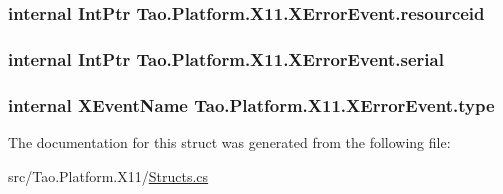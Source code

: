 \label{struct_tao_1_1_platform_1_1_x11_1_1_x_error_event_ac14a145f2eab548be2fceafa5f6c25ff}
\hypertarget{struct_tao_1_1_platform_1_1_x11_1_1_x_error_event_ac7b0c4ba5b882d353d5ad0f9f2017207}{
\subsubsection[{resourceid}]{\setlength{\rightskip}{0pt plus 5cm}internal IntPtr {\bf Tao.Platform.X11.XErrorEvent.resourceid}}}
\label{struct_tao_1_1_platform_1_1_x11_1_1_x_error_event_ac7b0c4ba5b882d353d5ad0f9f2017207}
\hypertarget{struct_tao_1_1_platform_1_1_x11_1_1_x_error_event_a2e56f1ab5dca13dda7c236bd4ea0bde5}{
\subsubsection[{serial}]{\setlength{\rightskip}{0pt plus 5cm}internal IntPtr {\bf Tao.Platform.X11.XErrorEvent.serial}}}
\label{struct_tao_1_1_platform_1_1_x11_1_1_x_error_event_a2e56f1ab5dca13dda7c236bd4ea0bde5}
\hypertarget{struct_tao_1_1_platform_1_1_x11_1_1_x_error_event_a5a939be28f2545b3b519ab16ecab0cda}{
\subsubsection[{type}]{\setlength{\rightskip}{0pt plus 5cm}internal {\bf XEventName} {\bf Tao.Platform.X11.XErrorEvent.type}}}
\label{struct_tao_1_1_platform_1_1_x11_1_1_x_error_event_a5a939be28f2545b3b519ab16ecab0cda}


The documentation for this struct was generated from the following file:\begin{DoxyCompactItemize}
\item 
src/Tao.Platform.X11/\hyperlink{_structs_8cs}{Structs.cs}\end{DoxyCompactItemize}
